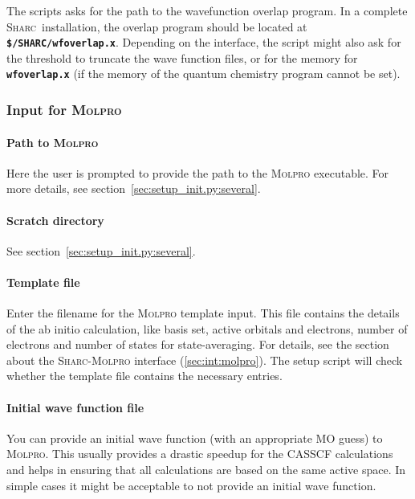 \documentclass[a4paper,10pt,DIV=15,openany,twoside=false]{scrbook}
\newcommand{\sharc}{\textsc{Sharc}}
\newcommand{\ttt}[1]{\textbf{\texttt{#1}}}
\begin{document}
The scripts asks for the path to the wavefunction overlap program. In a complete \sharc\ installation, the overlap program should be located at \ttt{\$/SHARC/wfoverlap.x}.
Depending on the interface, the script might also ask for the threshold to truncate the wave function files, or for the memory for \ttt{wfoverlap.x} (if the memory of the quantum chemistry program cannot be set).









\subsubsection{Input for \textsc{Molpro}}\label{sec:setup_init.py:molpro}

\paragraph{Path to \textsc{Molpro}}

Here the user is prompted to provide the path to the \textsc{Molpro} executable. 
For more details, see section~\ref{sec:setup_init.py:several}.

\paragraph{Scratch directory}

See section~\ref{sec:setup_init.py:several}.

\paragraph{Template file}

Enter the filename for the \textsc{Molpro} template input. This file contains the details of the ab initio calculation, like basis set, active orbitals and electrons, number of electrons and number of states for state-averaging. For details, see the section about the \sharc-\textsc{Molpro} interface (\ref{sec:int:molpro}). The setup script will check whether the template file contains the necessary entries. 

\paragraph{Initial wave function file}

You can provide an initial wave function (with an appropriate MO guess) to \textsc{Molpro}. This usually provides a drastic speedup for the CASSCF calculations and helps in ensuring that all calculations are based on the same active space. In simple cases it might be acceptable to not provide an initial wave function.
\end{document}
